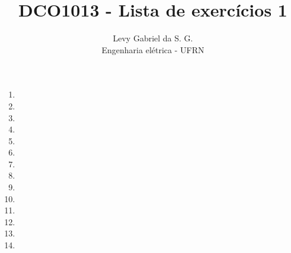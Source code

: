 \title{DCO1013 - Lista de exercícios 1}
\author{Levy Gabriel da S. G. \\ Engenharia elétrica - UFRN}

\maketitle
\thispagestyle{fancy}

\begin{enumerate}
    \item 
    \item 
    \item 
    \item 
    \item 
    \item 
    \item 
    \item 
    \item 
    \item 
    \item 
    \item 
    \item 
    \item 
    \end{enumerate}